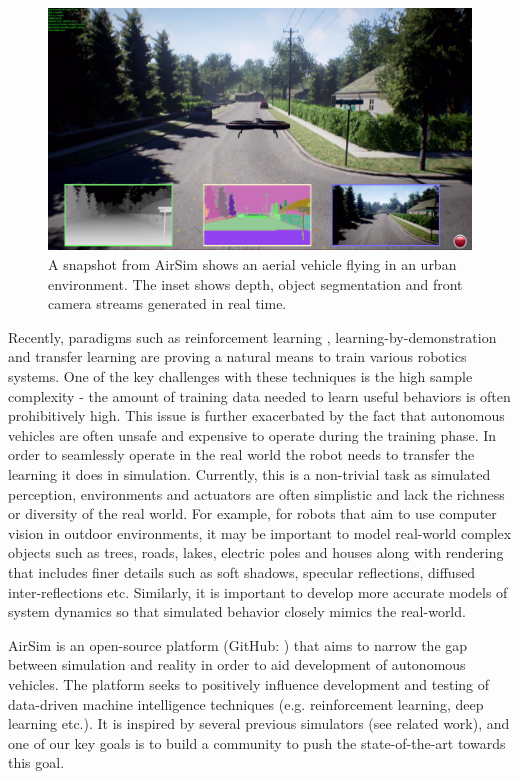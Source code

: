 \documentclass[graybox]{svmult}
\newcommand{\Name}{AirSim\xspace}
\begin{document}
\begin{figure}[htbp]
\centering
\includegraphics[width=\textwidth]{drone_depth_materials.PNG}
\caption{A snapshot from \Name shows an aerial vehicle flying in an urban environment. The inset shows depth, object segmentation and front camera streams generated in real time.}
\label{drone_depth_materials}
\end{figure}
Recently, paradigms such as reinforcement learning \cite{kober2013reinforcement}, learning-by-demonstration \cite{gao2012survey,Bagnell_2015_7891} and transfer learning \cite{pan2010survey} are proving a natural means to train various robotics systems. One of the key challenges with these techniques is the high sample complexity - the amount of training data needed to learn useful behaviors is often prohibitively high. This issue is further exacerbated by the fact that autonomous vehicles are often unsafe and expensive to operate during the training phase. In order to seamlessly operate in the real world the robot needs to transfer the learning it does in simulation. Currently, this is a non-trivial task as simulated perception, environments and actuators are often simplistic and lack the richness or diversity of the real world. For example, for robots that aim to use computer vision in outdoor environments, it may be important to model  real-world complex objects such as trees, roads, lakes, electric poles and houses along with rendering that includes finer details such as soft shadows, specular reflections, diffused inter-reflections etc. Similarly, it is important to develop more accurate models of system dynamics so that simulated behavior closely mimics the real-world.

\Name is an open-source platform (GitHub: \cite{AirSim}) that aims to narrow the gap between simulation and reality in order to aid development of autonomous vehicles. The platform seeks to positively influence development and testing of data-driven machine intelligence techniques (e.g. reinforcement learning, deep learning etc.). It is inspired by several previous simulators (see related work), and one of our key goals is to build a community to push the state-of-the-art towards this goal. 
\end{document}
